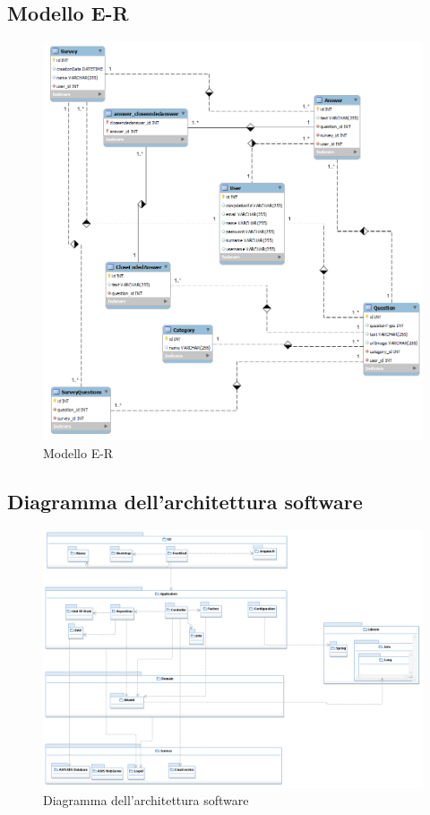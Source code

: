 \documentclass[12pt]{article}
\begin{document}
\subsection{Modello E-R}
\begin{figure}[H]
\includegraphics[scale=0.5, center]{ER.png}
\caption{Modello E-R}
\end{figure}
\subsection{Diagramma dell'architettura software}
\begin{figure}[H]
\centering
\includegraphics[scale=0.5]{UNIMIBModule_LogicalArchitectureDiagram.png}
\caption{Diagramma dell'architettura software}
\end{figure}
\end{document}
